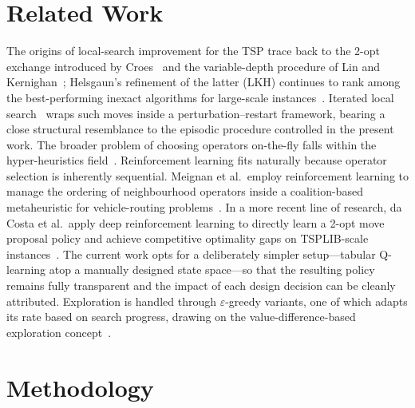 \documentclass[10pt,twocolumn]{article}
\begin{document}
\section{Related Work}
The origins of local-search improvement for the TSP trace back to the 2-opt
exchange introduced by Croes~\cite{croes1958} and the variable-depth procedure
of Lin and Kernighan~\cite{lin1973}; Helsgaun's refinement of the latter (LKH)
continues to rank among the best-performing inexact algorithms for
large-scale instances~\cite{helsgaun2000}. Iterated local
search~\cite{lourenco2003} wraps such moves inside a perturbation--restart
framework, bearing a close structural resemblance to the episodic procedure
controlled in the present work. The broader problem of choosing operators
on-the-fly falls within the hyper-heuristics
field~\cite{burke2013}. Reinforcement learning fits naturally because operator
selection is inherently sequential. Meignan et al.\ employ reinforcement
learning to manage the ordering of neighbourhood operators inside a
coalition-based metaheuristic for vehicle-routing
problems~\cite{meignan2010}. In a more recent line of research, da Costa
et al.\ apply deep reinforcement learning to directly learn a 2-opt move
proposal policy and achieve competitive optimality gaps on TSPLIB-scale
instances~\cite{dacosta2020}. The current work opts for a deliberately simpler
setup---tabular Q-learning atop a manually designed state space---so that the
resulting policy remains fully transparent and the impact of each design
decision can be cleanly attributed. Exploration is handled through
$\varepsilon$-greedy variants, one of which adapts its rate based on
search progress, drawing on the value-difference-based exploration
concept~\cite{tokic2010}.

\section{Methodology}\label{sec:method}
\end{document}
